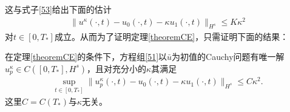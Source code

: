 这与式子\eqref{53}给出下面的估计
\begin{eqnarray*}
  \|u^\kappa(\cdot, t) - u_0 (\cdot, t) - \kappa u_1(\cdot, t) \|_{H^s} \le K \kappa^2
\end{eqnarray*}
对$t \in [0,T_*]$成立。从而为了证明定理\ref{theoremCE}，只需证明下面的结果：
\begin{lemma}\label{lemmaCE}
在定理\ref{theoremCE}的条件下，方程组\eqref{51}以$\bar{u}$为初值的Cauchy问题有唯一解$u_p^\kappa \in C([0,T_*],H^s)$，且对充分小的$\kappa$其满足
\begin{eqnarray}\label{eq:wcediff}
  \sup_{t \in [0,T_*]} \| u^\kappa_p(\cdot,t) - u_0 (\cdot, t) - \kappa u_1(\cdot, t)\|_{H^s} \le C \kappa^2.
\end{eqnarray}
这里$C=C(T_*)$与$\kappa$无关。
\end{lemma}


